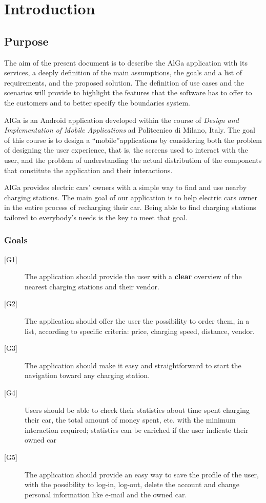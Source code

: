 \chapter{Introduction}
\section{Purpose}
The aim of the present document is to describe the AlGa application with its services, a deeply definition of the main assumptions, the goals and a list of requirements, and the proposed solution. The definition of use cases and the scenarios will provide to highlight the features that the software has to offer to the customers and to better specify the boundaries system.

AlGa is an Android application developed within the course of \textit{Design and Implementation of Mobile Applications} ad Politecnico di Milano, Italy. The goal of this course is to design a ``mobile''applications by considering both the problem of designing the user experience, that is, the screens used to interact with the user, and the problem of understanding the actual distribution of the components that constitute the application and their interactions.

AlGa provides electric cars' owners with a simple way to find and use nearby charging stations. The main goal of our application is to help electric cars owner in the entire process of recharging their car. Being able to find charging stations tailored to everybody's needs is the key to meet that goal.
\subsection{Goals}
\begin{description} 
    \item[{[G1]}] The application should provide the user with a \textbf{clear} overview of the nearest charging stations and their vendor.
    \item[{[G2]}] The application should offer the user the possibility to order them, in a list, according to specific criteria: price, charging speed, distance, vendor.
    \item[{[G3]}]  The application should make it easy and straightforward to start the navigation toward any charging station.
    \item[{[G4]}] Users should be able to check their statistics about time spent charging their car, the total amount of money spent, etc. with the minimum interaction required; statistics can be enriched if the user indicate their owned car
    \item[{[G5]}] The application should provide an easy way to save the profile of the user, with the possibility to log-in, log-out, delete the account and change personal information like e-mail and the owned car.
\end{description}

